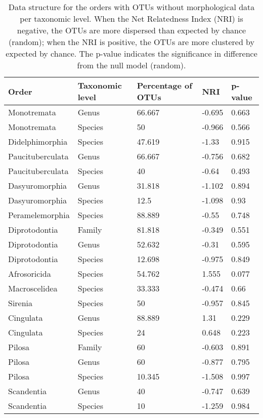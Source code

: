 \begin{longtable}{lllll}
\caption{Data structure for the orders with OTUs without morphological data per taxonomic level. When the Net Relatedness Index (NRI) is negative, the OTUs are more dispersed than expected by chance (random); when the NRI is positive, the OTUs are more clustered by expected by chance. The p-value indicates the significance in difference from the null model (random).} \\ 
  \hline
Order & Taxonomic level & Percentage of OTUs & NRI & p-value \\ 
  \hline
Monotremata & Genus & 66.667 & -0.695 & 0.663 \\ 
  Monotremata & Species & 50 & -0.966 & 0.566 \\ 
  Didelphimorphia & Species & 47.619 & -1.33 & 0.915 \\ 
  Paucituberculata & Genus & 66.667 & -0.756 & 0.682 \\ 
  Paucituberculata & Species & 40 & -0.64 & 0.493 \\ 
  Dasyuromorphia & Genus & 31.818 & -1.102 & 0.894 \\ 
  Dasyuromorphia & Species & 12.5 & -1.098 & 0.93 \\ 
  Peramelemorphia & Species & 88.889 & -0.55 & 0.748 \\ 
  Diprotodontia & Family & 81.818 & -0.349 & 0.551 \\ 
  Diprotodontia & Genus & 52.632 & -0.31 & 0.595 \\ 
  Diprotodontia & Species & 12.698 & -0.975 & 0.849 \\ 
  Afrosoricida & Species & 54.762 & 1.555 & 0.077 \\ 
  Macroscelidea & Species & 33.333 & -0.474 & 0.66 \\ 
  Sirenia & Species & 50 & -0.957 & 0.845 \\ 
  Cingulata & Genus & 88.889 & 1.31 & 0.229 \\ 
  Cingulata & Species & 24 & 0.648 & 0.223 \\ 
  Pilosa & Family & 60 & -0.603 & 0.891 \\ 
  Pilosa & Genus & 60 & -0.877 & 0.795 \\ 
  Pilosa & Species & 10.345 & -1.508 & 0.997 \\ 
  Scandentia & Genus & 40 & -0.747 & 0.639 \\ 
  Scandentia & Species & 10 & -1.259 & 0.984 \\ 

\end{longtable}
